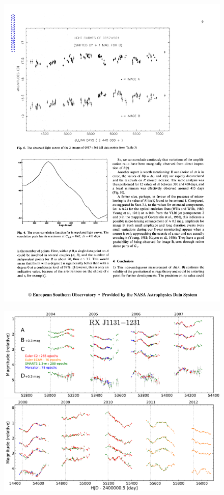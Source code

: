 \begin{figure}
\begin{minipage}{0.48\linewidth}
\centering\includegraphics[width=0.95\linewidth]{figures/Vanderriest89_fig5.pdf}
\end{minipage}\hfill
\begin{minipage}{0.48\linewidth}
\centering\includegraphics[width=0.95\linewidth]{figures/Tewes13-fig4_part1.pdf}
\centering\includegraphics[width=0.95\linewidth]{figures/Tewes13-fig4_part2.pdf}

\end{minipage}
\end{figure}
